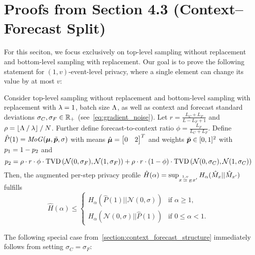 \section{Proofs from Section 4.3 (Context--Forecast Split)}\label{appendix:proofs_context_forecast_split}
For this seciton, we focus exclusively on top-level sampling without replacement and bottom-level sampling with replacement.
Our goal is to prove the following statement for $(1,v)$-event-level privacy, where a single element can change its value by at most $v$:
\begin{theorem}\label{theorem:data_augmentation_general}
    Consider top-level sampling without replacement and bottom-level sampling with replacement with $\lambda = 1$, 
    batch size $\Lambda$, as well as context and forecast standard deviations $\sigma_C, \sigma_F \in {\mathbb{R}}_+$ 
    (see~\cref{eq:gradient_noise}). 
    Let $r = \frac{L_C + L_F}{L - L_F + 1}$ and  
    $\rho = \lfloor \Lambda \mathbin{/} \lambda \rfloor \mathbin{/} N$.
    Further define forecast-to-context ratio $\phi = \frac{L_F}{L_C + L_F}$. 
    Define
    $\hat{P}(1) = \mathit{MoG}({\bm{\mu}}, \tilde{{\bm{p}}}, \sigma)$ with
    means
     $\hat{{\bm{\mu}}} = \begin{bmatrix}
        0 & 2
    \end{bmatrix}^T$ and weights
     $\tilde{{\bm{p}}} \in [0,1]^2$
     with ${p}_1 = 1 - {p}_2$ and
     \begin{equation*}
         {p}_2 = \rho \cdot r \cdot \phi \cdot \mathrm{TVD}\left(\mathcal{N}(0,\sigma_F), \mathcal{N}(1,\sigma_F)\right)
         +  \rho \cdot r \cdot (1 - \phi) \cdot \mathrm{TVD}\left(\mathcal{N}(0,\sigma_C), \mathcal{N}(1,\sigma_C)\right)
     \end{equation*}
    Then, the augmented per-step privacy profile $\hat{H}(\alpha) = \sup_{x \overset{1,v}{\simeq}_{E} x'} H_\alpha(\hat{M}_x || \hat{M}_{x'})$ fulfills 
    \begin{equation*}
        \hat{H}(\alpha) \leq 
        \begin{cases}
            H_\alpha(\hat{P}(1) || \mathcal{N}(0,\sigma)) & \text{if } \alpha \geq 1,\\
            H_\alpha(\mathcal{N}(0,\sigma) || \hat{P}(1)) & \text{if } 0 \leq \alpha < 1.
        \end{cases}
    \end{equation*}
\end{theorem}
The following special case from~\cref{section:context_forecast_structure} immediately follows from setting $\sigma_C = \sigma_F$:
\amplificationbyaugmentationworwr*

